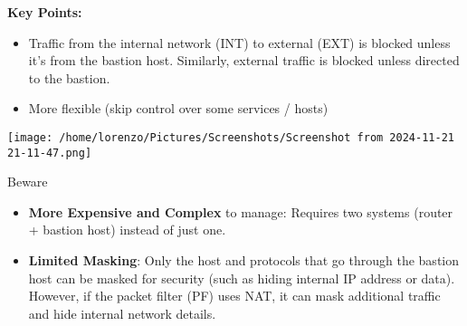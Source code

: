 \begin{minipage}{0.5\textwidth}
	\vspace{-1.5cm}
    \textbf{Key Points:}
    \begin{itemize}
        \item Traffic from the internal network (INT) to external (EXT) is blocked unless it’s from the bastion host. Similarly, external traffic is blocked unless directed to the bastion.
        \item More flexible (skip control over some services / hosts)
    \end{itemize}
\end{minipage} 
\hfill
\begin{minipage}{0.5\textwidth}
    \centering
    \texttt{[image: 
        /home/lorenzo/Pictures/Screenshots/Screenshot from 2024-11-21 21-11-47.png]}
\end{minipage}
\begin{center}
    \begin{quotebox-red}{Beware}
        \begin{itemize}
            \item \textbf{More Expensive and Complex} 
       to manage: Requires two systems (router + bastion host) instead of just one.
       \item \textbf{Limited Masking}: Only the host and protocols that go through the bastion host can be masked for security (such as hiding internal IP address or data). However, if the packet filter (PF) uses NAT, it can mask additional traffic and hide internal network details.
     \end{itemize}
    \end{quotebox-red}   
\end{center}

